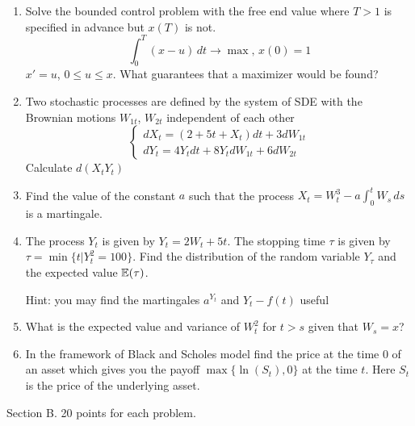 \documentclass[12pt, a4paper]{article}
\begin{document}
\begin{enumerate}
\item Solve the bounded control problem with the free end value where $T>1$ is specified in advance but $x(T)$ is not.
\begin{equation}
\int_0^T(x-u)\,dt\to \max,\, x(0)=1 \nonumber
\end{equation}
$x'=u$, $0\leq u\leq x$. What guarantees that a maximizer would be found?

\item Two stochastic processes are defined by the system of SDE with the Brownian motions $W_{1t}$, $W_{2t}$ independent of each other
\begin{equation}
\begin{cases}
dX_t=(2+5t+X_t)dt+3dW_{1t} \\
dY_t=4Y_t dt+8Y_t dW_{1t}+6dW_{2t} \nonumber
\end{cases}
\end{equation}
Calculate $d(X_t Y_t)$

\item Find the value of the constant $a$ such that the process $X_t=W_t^3-a\int_0^t W_s\,ds$ is a martingale.

\item The process $Y_t$ is given by $Y_t=2W_t+5t$. The stopping time $\tau$ is given by $\tau=\min\{t|Y_t^2=100\}$. Find the distribution of the random variable $Y_\tau$ and the expected value $\mathbb{E}(\tau)$.


Hint: you may find the martingales $a^{Y_t}$ and $Y_t-f(t)$ useful

\item What is the expected value and variance of $W_t^2$ for $t>s$ given that $W_s=x$?

\item In the framework of Black and Scholes model find the price at the time $0$ of an asset which gives you the payoff $\max\{\ln(S_t),0\}$ at the time $t$. Here $S_t$ is the price of the underlying asset.
\end{enumerate}

Section B. 20 points for each problem.
\end{document}
